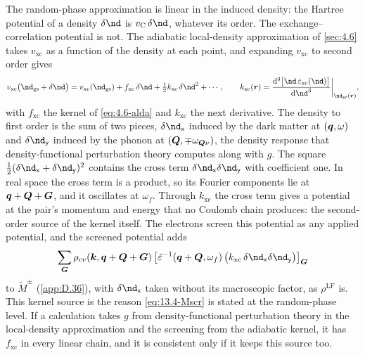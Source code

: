 The random-phase approximation is linear in the induced density: the Hartree potential of a density $\delta\nd$ is $v_{\mathrm{C}}\,\delta\nd$, whatever its order. The exchange--correlation potential is not. The adiabatic local-density approximation of \cref{sec:4.6} takes $v_{\mathrm{xc}}$ as a function of the density at each point, and expanding $v_{\mathrm{xc}}$ to second order gives
\begin{equation}
  v_{\mathrm{xc}}\bigl(\nd_{\mathrm{gs}} + \delta\nd\bigr) = v_{\mathrm{xc}}(\nd_{\mathrm{gs}}) + f_{\mathrm{xc}}\,\delta\nd + \tfrac12k_{\mathrm{xc}}\,\delta\nd^2 + \cdots , \qquad
  k_{\mathrm{xc}}(\vect{r}) = \frac{\dd^3\bigl[\nd\,\varepsilon_{\mathrm{xc}}(\nd)\bigr]}{\dd\nd^3}\bigg|_{\nd_{\mathrm{gs}}(\vect{r})} ,
  \label{eq:13.4-kxc}
\end{equation}
with $f_{\mathrm{xc}}$ the kernel of \cref{eq:4.6-alda} and $k_{\mathrm{xc}}$ the next derivative. The density to first order is the sum of two pieces, $\delta\nd_{\mathsf{x}}$ induced by the dark matter at $(\bm{q},\omega)$ and $\delta\nd_{\mathsf{y}}$ induced by the phonon at $(\bm{Q},\mp\omega_{\bm{Q}\nu})$, the density response that density-functional perturbation theory computes along with $g$. The square $\frac12(\delta\nd_{\mathsf{x}} + \delta\nd_{\mathsf{y}})^2$ contains the cross term $\delta\nd_{\mathsf{x}}\delta\nd_{\mathsf{y}}$ with coefficient one. In real space the cross term is a product, so its Fourier components lie at $\bm{q}+\bm{Q}+\bm{G}$, and it oscillates at $\omega_f$. Through $k_{\mathrm{xc}}$ the cross term gives a potential at the pair's momentum and energy that no Coulomb chain produces: the second-order source of the kernel itself. The electrons screen this potential as any applied potential, and the screened potential adds
\begin{equation*}
  \sum_{\vect{G}}\rho_{cv}(\vect{k},\vect{q}+\vect{Q}+\vect{G})\,\bigl[\tilde\varepsilon^{-1}(\vect{q}+\vect{Q},\omega_f)\,\bigl(k_{\mathrm{xc}}\,\delta\nd_{\mathsf{x}}\delta\nd_{\mathsf{y}}\bigr)\bigr]_{\vect{G}}
\end{equation*}
to $\tilde M^\pm$ (\cref{app:D.36}), with $\delta\nd_{\mathsf{x}}$ taken without its macroscopic factor, as $\rho^{\mathrm{LF}}$ is. This kernel source is the reason \cref{eq:13.4-Mscr} is stated at the random-phase level. If a calculation takes $g$ from density-functional perturbation theory in the local-density approximation and the screening from the adiabatic kernel, it has $f_{\mathrm{xc}}$ in every linear chain, and it is consistent only if it keeps this source too.

